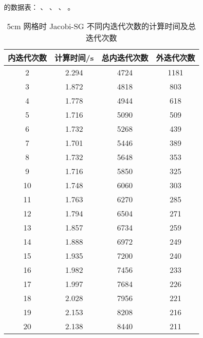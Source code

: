 \begin{datasheet}
的数据表：
、
、
、
。

\begin{table}
\centering
\caption{5cm 网格时 Jacobi-SG 不同内迭代次数的计算时间及总迭代次数}
\label{tab:equsolve.iter.jacobi-sg.5cm}
\begin{tabular}{cccc}
\toprule
内迭代次数 & 计算时间/s & 总内迭代次数 & 外迭代次数\\
\midrule
2 & 2.294 & 4724 & 1181\\
3 & 1.872 & 4818 & 803\\
4 & 1.778 & 4944 & 618\\
5 & 1.716 & 5090 & 509\\
6 & 1.732 & 5268 & 439\\
7 & 1.701 & 5446 & 389\\
8 & 1.732 & 5648 & 353\\
9 & 1.716 & 5850 & 325\\
10 & 1.748 & 6060 & 303\\
11 & 1.763 & 6270 & 285\\
12 & 1.794 & 6504 & 271\\
13 & 1.857 & 6734 & 259\\
14 & 1.888 & 6972 & 249\\
15 & 1.935 & 7200 & 240\\
16 & 1.982 & 7456 & 233\\
17 & 1.997 & 7684 & 226\\
18 & 2.028 & 7956 & 221\\
19 & 2.153 & 8208 & 216\\
20 & 2.138 & 8440 & 211\\
\bottomrule
\end{tabular}
\end{table}


\end{datasheet}
